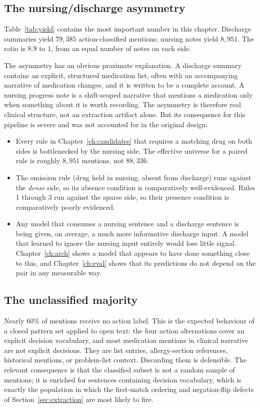 \subsection{The nursing/discharge asymmetry}

Table~\ref{tab:yield} contains the most important number in this chapter.
Discharge summaries yield $79{,}385$ action-classified mentions; nursing notes
yield $8{,}951$. The ratio is $8.9$ to $1$, from an equal number of notes on
each side.

The asymmetry has an obvious proximate explanation. A discharge summary contains
an explicit, structured medication list, often with an accompanying narrative of
medication changes, and it is written to be a complete account. A nursing
progress note is a shift-scoped narrative that mentions a medication only when
something about it is worth recording. The asymmetry is therefore real clinical
structure, not an extraction artifact alone. But its consequence for this
pipeline is severe and was not accounted for in the original design:

\begin{itemize}
\item Every rule in Chapter~\ref{ch:candidates} that requires a matching drug on
      both sides is bottlenecked by the nursing side. The effective universe for
      a paired rule is roughly $8{,}951$ mentions, not $88{,}336$.
\item The omission rule (drug held in nursing, absent from discharge) runs
      against the \emph{dense} side, so its absence condition is comparatively
      well-evidenced. Rules 1 through 3 run against the sparse side, so their
      presence condition is comparatively poorly evidenced.
\item Any model that consumes a nursing sentence and a discharge sentence is
      being given, on average, a much more informative discharge input. A model
      that learned to ignore the nursing input entirely would lose little
      signal. Chapter~\ref{ch:arch} shows a model that appears to have done
      something close to this, and Chapter~\ref{ch:eval} shows that its
      predictions do not depend on the pair in any measurable way.
\end{itemize}

\subsection{The unclassified majority}

Nearly $60\%$ of mentions receive no action label. This is the expected
behaviour of a closed pattern set applied to open text: the four action
alternations cover an explicit decision vocabulary, and most medication mentions
in clinical narrative are not explicit decisions. They are list entries,
allergy-section references, historical mentions, or problem-list context.
Discarding them is defensible. The relevant consequence is that the classified
subset is not a random sample of mentions; it is enriched for sentences
containing decision vocabulary, which is exactly the population in which the
first-match ordering and negation-flip defects of
Section~\ref{sec:extraction} are most likely to fire.

